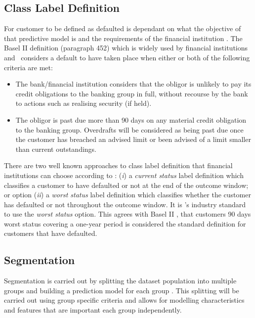 \subsection{Class Label Definition} \label{classLabelDef}
For customer to be defined as defaulted is dependant on what the objective of that predictive model is and the requirements of the financial institution \citep{mcnab_principles_2000}. The Basel II definition (paragraph 452) which is widely used by financial institutions and \subjectname\ considers a default to have taken place when either or both of the following criteria are met:
\vspace{-3mm} 
\begin{itemize}
	\item The bank/financial institution considers that the obligor is unlikely to pay its credit obligations to the banking group in full, without recourse by the bank to actions such as realising security (if held).
	\item The obligor is past due more than 90 days on any material credit obligation to the banking group. Overdrafts will be considered as being past due once the customer has breached an advised limit or been advised of a limit smaller than current outstandings.
\end{itemize} 

There are two well known approaches to class label definition that financial institutions can choose according to \cite{anderson_credit_2007}: (\textit{i}) a \textit{current status} label definition which classifies a customer to have defaulted or not at the end of the outcome window; or option (\textit{ii}) a \textit{worst status} label definition which classifies whether the customer has defaulted or not throughout the outcome window. It is \subjectname's industry standard to use the \textit{worst status} option. This agrees with Basel II \citep{basel_international_2006}, that customers 90 days worst status covering a one-year period is considered the standard definition for customers that have defaulted. 


\subsection{Segmentation}\label{sec:segment}
Segmentation is carried out by splitting the dataset population into multiple groups and building a prediction model for each group \citep{myatt_making_2007}. This splitting will be carried out using group specific criteria and allows for modelling characteristics and features that are important each group independently.

